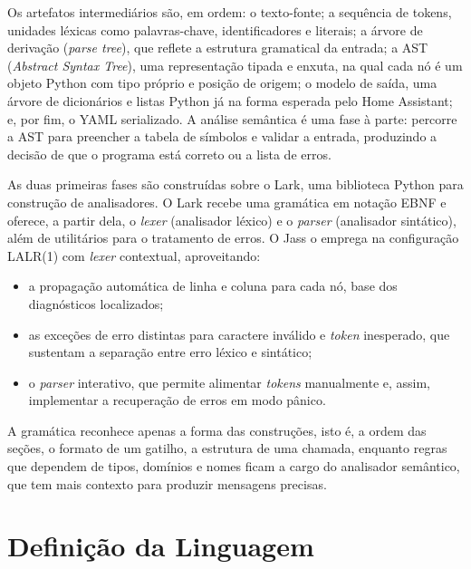 \documentclass[12pt]{article}
\begin{document}
Os artefatos intermediários são, em ordem: o texto-fonte; a sequência de tokens, unidades léxicas como
palavras-chave, identificadores e literais; a árvore de derivação
(\emph{parse tree}), que reflete a estrutura gramatical da
entrada; a AST (\emph{Abstract Syntax Tree}), uma representação
tipada e enxuta, na qual cada nó é um objeto Python com tipo próprio e
posição de origem; o modelo de saída, uma árvore de dicionários e listas
Python já na forma esperada pelo Home Assistant; e, por fim, o YAML
serializado. A análise semântica é uma fase à parte: percorre a AST para
preencher a tabela de símbolos e validar a entrada, produzindo a decisão de que o programa está correto ou a
lista de erros.


As duas primeiras fases são construídas sobre o Lark, uma biblioteca
Python para construção de analisadores. O Lark recebe uma gramática em
notação EBNF e oferece, a partir dela, o \emph{lexer} (analisador
léxico) e o \emph{parser} (analisador sintático), além de utilitários
para o tratamento de erros. O Jass o emprega na configuração
LALR(1) com \emph{lexer} contextual, aproveitando:

\begin{itemize}
\tightlist
\item
  a propagação automática de linha e coluna para cada nó, base dos
  diagnósticos localizados;
\item
  as exceções de erro distintas para caractere inválido e \emph{token}
  inesperado, que sustentam a separação entre erro léxico e sintático;
\item
  o \emph{parser} interativo, que permite alimentar \emph{tokens}
  manualmente e, assim, implementar a recuperação de erros em modo
  pânico.
\end{itemize}

A gramática reconhece apenas a forma das construções, isto é, a ordem das
seções, o formato de um gatilho, a estrutura de uma chamada, enquanto
regras que dependem de tipos, domínios e nomes ficam a cargo do
analisador semântico, que tem mais contexto para produzir mensagens
precisas.

\section{Definição da Linguagem}
\end{document}
